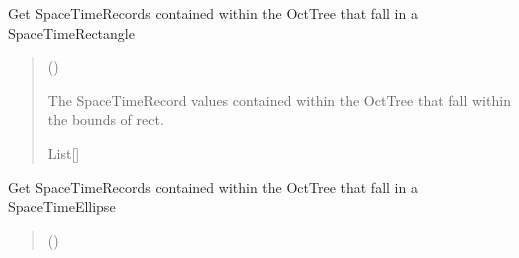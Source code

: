 \documentclass[letterpaper,10pt,english]{sphinxmanual}
\begin{document}
\begin{fulllineitems}
\begin{fulllineitems}
\end{fulllineitems}


\begin{fulllineitems}
\label{\detokenize{octtree:geotrees.octtree.OctTree.query}}
\pysigstartsignatures
\pysiglinewithargsret
{}
{\sphinxparamcomma {}}
{}
\pysigstopsignatures
\sphinxAtStartPar
Get SpaceTimeRecords contained within the OctTree that fall in a
SpaceTimeRectangle
\begin{quote}\begin{description}
\sphinxAtStartPar
{} ({\hyperref[\detokenize{shape:geotrees.shape.SpaceTimeRectangle}]{}})

\sphinxAtStartPar
The SpaceTimeRecord values contained within the OctTree that fall
within the bounds of rect.

\sphinxAtStartPar
List{[}{\hyperref[\detokenize{record:geotrees.record.SpaceTimeRecord}]{}}{]}

\end{description}\end{quote}

\end{fulllineitems}


\begin{fulllineitems}
\label{\detokenize{octtree:geotrees.octtree.OctTree.query_ellipse}}
\pysigstartsignatures
\pysiglinewithargsret
{}
{\sphinxparamcomma {}}
{}
\pysigstopsignatures
\sphinxAtStartPar
Get SpaceTimeRecords contained within the OctTree that fall in a
SpaceTimeEllipse
\begin{quote}\begin{description}
\sphinxAtStartPar
{} ({\hyperref[\detokenize{shape:geotrees.shape.SpaceTimeEllipse}]{}})


\end{description}
\end{quote}
\end{fulllineitems}
\end{fulllineitems}
\end{document}
